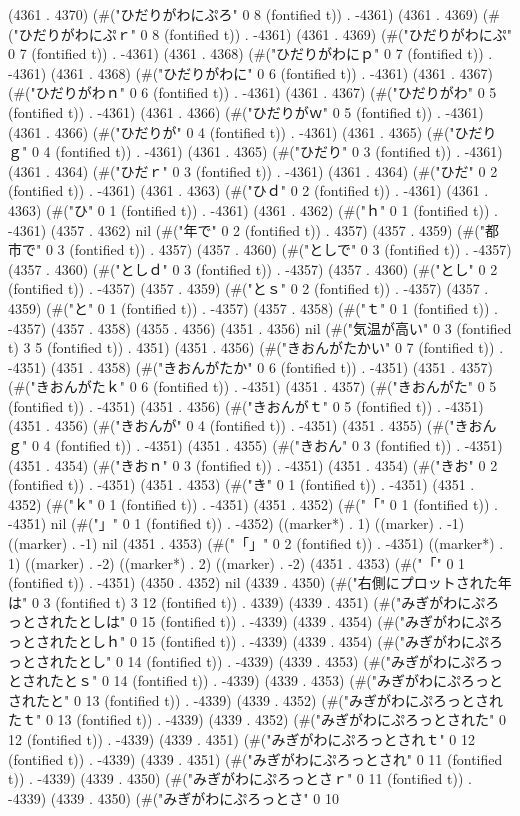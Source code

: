 (4361 . 4370) (#("ひだりがわにぷろ" 0 8 (fontified t)) . -4361) (4361 . 4369) (#("ひだりがわにぷｒ" 0 8 (fontified t)) . -4361) (4361 . 4369) (#("ひだりがわにぷ" 0 7 (fontified t)) . -4361) (4361 . 4368) (#("ひだりがわにｐ" 0 7 (fontified t)) . -4361) (4361 . 4368) (#("ひだりがわに" 0 6 (fontified t)) . -4361) (4361 . 4367) (#("ひだりがわｎ" 0 6 (fontified t)) . -4361) (4361 . 4367) (#("ひだりがわ" 0 5 (fontified t)) . -4361) (4361 . 4366) (#("ひだりがｗ" 0 5 (fontified t)) . -4361) (4361 . 4366) (#("ひだりが" 0 4 (fontified t)) . -4361) (4361 . 4365) (#("ひだりｇ" 0 4 (fontified t)) . -4361) (4361 . 4365) (#("ひだり" 0 3 (fontified t)) . -4361) (4361 . 4364) (#("ひだｒ" 0 3 (fontified t)) . -4361) (4361 . 4364) (#("ひだ" 0 2 (fontified t)) . -4361) (4361 . 4363) (#("ひｄ" 0 2 (fontified t)) . -4361) (4361 . 4363) (#("ひ" 0 1 (fontified t)) . -4361) (4361 . 4362) (#("ｈ" 0 1 (fontified t)) . -4361) (4357 . 4362) nil (#("年で" 0 2 (fontified t)) . 4357) (4357 . 4359) (#("都市で" 0 3 (fontified t)) . 4357) (4357 . 4360) (#("としで" 0 3 (fontified t)) . -4357) (4357 . 4360) (#("としｄ" 0 3 (fontified t)) . -4357) (4357 . 4360) (#("とし" 0 2 (fontified t)) . -4357) (4357 . 4359) (#("とｓ" 0 2 (fontified t)) . -4357) (4357 . 4359) (#("と" 0 1 (fontified t)) . -4357) (4357 . 4358) (#("ｔ" 0 1 (fontified t)) . -4357) (4357 . 4358) (4355 . 4356) (4351 . 4356) nil (#("気温が高い" 0 3 (fontified t) 3 5 (fontified t)) . 4351) (4351 . 4356) (#("きおんがたかい" 0 7 (fontified t)) . -4351) (4351 . 4358) (#("きおんがたか" 0 6 (fontified t)) . -4351) (4351 . 4357) (#("きおんがたｋ" 0 6 (fontified t)) . -4351) (4351 . 4357) (#("きおんがた" 0 5 (fontified t)) . -4351) (4351 . 4356) (#("きおんがｔ" 0 5 (fontified t)) . -4351) (4351 . 4356) (#("きおんが" 0 4 (fontified t)) . -4351) (4351 . 4355) (#("きおんｇ" 0 4 (fontified t)) . -4351) (4351 . 4355) (#("きおん" 0 3 (fontified t)) . -4351) (4351 . 4354) (#("きおｎ" 0 3 (fontified t)) . -4351) (4351 . 4354) (#("きお" 0 2 (fontified t)) . -4351) (4351 . 4353) (#("き" 0 1 (fontified t)) . -4351) (4351 . 4352) (#("ｋ" 0 1 (fontified t)) . -4351) (4351 . 4352) (#("「" 0 1 (fontified t)) . -4351) nil (#("」" 0 1 (fontified t)) . -4352) ((marker*) . 1) ((marker) . -1) ((marker) . -1) nil (4351 . 4353) (#("「」" 0 2 (fontified t)) . -4351) ((marker*) . 1) ((marker) . -2) ((marker*) . 2) ((marker) . -2) (4351 . 4353) (#("「" 0 1 (fontified t)) . -4351) (4350 . 4352) nil (4339 . 4350) (#("右側にプロットされた年は" 0 3 (fontified t) 3 12 (fontified t)) . 4339) (4339 . 4351) (#("みぎがわにぷろっとされたとしは" 0 15 (fontified t)) . -4339) (4339 . 4354) (#("みぎがわにぷろっとされたとしｈ" 0 15 (fontified t)) . -4339) (4339 . 4354) (#("みぎがわにぷろっとされたとし" 0 14 (fontified t)) . -4339) (4339 . 4353) (#("みぎがわにぷろっとされたとｓ" 0 14 (fontified t)) . -4339) (4339 . 4353) (#("みぎがわにぷろっとされたと" 0 13 (fontified t)) . -4339) (4339 . 4352) (#("みぎがわにぷろっとされたｔ" 0 13 (fontified t)) . -4339) (4339 . 4352) (#("みぎがわにぷろっとされた" 0 12 (fontified t)) . -4339) (4339 . 4351) (#("みぎがわにぷろっとされｔ" 0 12 (fontified t)) . -4339) (4339 . 4351) (#("みぎがわにぷろっとされ" 0 11 (fontified t)) . -4339) (4339 . 4350) (#("みぎがわにぷろっとさｒ" 0 11 (fontified t)) . -4339) (4339 . 4350) (#("みぎがわにぷろっとさ" 0 10 